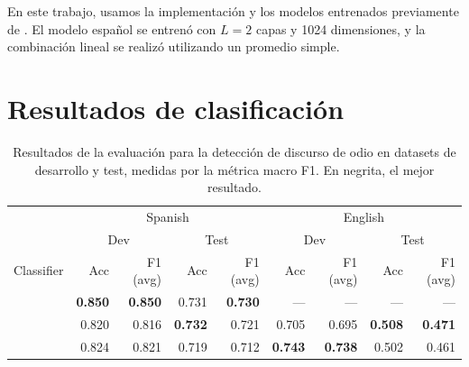 %

En este trabajo, usamos la implementación y los modelos entrenados previamente de \cite{che-EtAl:2018:K18-2}. El modelo español se entrenó con $L = 2 $ capas y 1024 dimensiones, y la combinación lineal se realizó utilizando un promedio simple.





\section{Resultados de clasificación}

\begin{table}[t]
    \centering
    \footnotesize
    \begin{tabular}{l  r  r  r  r | r  r  r  r }
         & \multicolumn{4}{c}{Spanish} & \multicolumn{4}{c}{English} \\
         &  \multicolumn{2}{c}{Dev}& \multicolumn{2}{c}{Test} &  \multicolumn{2}{c}{Dev}& \multicolumn{2}{c}{Test} \\
        Classifier & Acc & F1 (avg) & Acc & F1 (avg) & Acc & F1 (avg) & Acc & F1 (avg)\\
        \hline
        \svmmodel{}          & \textbf{0.850} & \textbf{0.850} & 0.731           & \textbf{0.730} & ---            & ---             & ---            & ---           \\
        \elmomodel{}         & 0.820          & 0.816          & \textbf{0.732}  & 0.721          & 0.705          & 0.695           & \textbf{0.508} & \textbf{0.471}\\
        \elmobowmodel{}      & 0.824          & 0.821          & 0.719           & 0.712          & \textbf{0.743} & \textbf{0.738}  & 0.502          & 0.461         \\
        \hline
    \end{tabular}
    \caption{Resultados de la evaluación para la detección de discurso de odio en datasets de desarrollo y test, medidas por la métrica macro F1. En negrita, el mejor resultado.}
    \label{tab:hateval_task_a}
\end{table}



